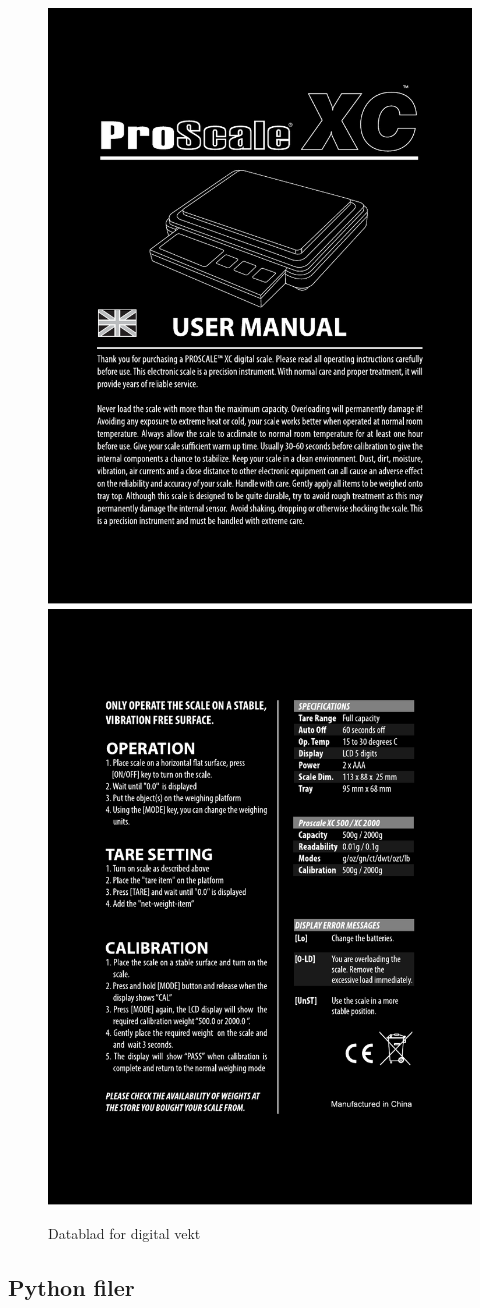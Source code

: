 \documentclass[reprint,norsk,notitlepage]{revtex4-2}
\begin{document}
\begin{figure}[!ht]
  \centering
  \includegraphics[width = .49\textwidth]{fig/proscalexc.pdf}
  \includegraphics[width = .49\textwidth]{fig/proscalexc2.pdf}
  \caption{Datablad for digital vekt}
  \label{fig: datalad digital vekt}
\end{figure}

\newpage 
\clearpage
\subsection{Python filer}
\end{document}
